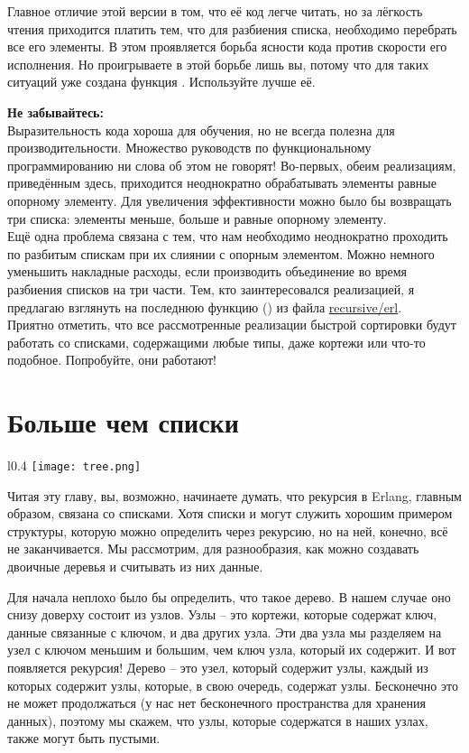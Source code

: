 Главное отличие этой версии в том, что её код легче читать, но за лёгкость чтения приходится платить тем, что для разбиения списка, необходимо перебрать все его элементы. В этом проявляется борьба ясности кода против скорости его исполнения. Но проигрываете в этой борьбе лишь вы, потому что для таких ситуаций уже создана функция . Используйте лучше её.\\
\colorbox{lorange}
{
    \begin{minipage}{1.0\linewidth}
\textbf{Не забывайтесь:}\\
Выразительность кода хороша для обучения, но не всегда полезна для производительности. Множество руководств по функциональному программированию ни слова об этом не говорят! Во\--первых, обеим реализациям, приведённым здесь, приходится неоднократно обрабатывать элементы равные опорному элементу. Для увеличения эффективности можно было бы возвращать три списка: элементы меньше, больше и равные опорному элементу.\\
Ещё одна проблема связана с тем, что нам необходимо неоднократно проходить по разбитым спискам при их слиянии с опорным элементом. Можно немного уменьшить накладные расходы, если производить объединение во время разбиения списков на три части. Тем, кто заинтересовался реализацией, я предлагаю взглянуть на последнюю функцию () из файла \href{http://learnyousomeerlang.com/static/erlang/recursive.erl}{recursive/erl}.\\
Приятно отметить, что все рассмотренные реализации быстрой сортировки будут работать со списками, содержащими любые типы, даже кортежи или что\--то подобное. Попробуйте, они работают!
    \end{minipage}
}
\section{Больше чем списки}
\begin{wrapfigure}{l}{0.4\linewidth}
    \texttt{[image: tree.png]}
\end{wrapfigure}
Читая эту главу, вы, возможно, начинаете думать, что рекурсия в Erlang, главным образом, связана со списками. Хотя списки и могут служить хорошим примером структуры, которую можно определить через рекурсию, но на ней, конечно, всё не заканчивается. Мы рассмотрим, для разнообразия, как можно создавать двоичные деревья и считывать из них данные.

Для начала неплохо было бы определить, что такое дерево. В нашем случае оно снизу доверху состоит из узлов. Узлы \--- это кортежи, которые содержат ключ, данные связанные с ключом, и два других узла. Эти два узла мы разделяем на узел с ключом меньшим и большим, чем ключ узла, который их содержит. И вот появляется рекурсия! Дерево \--- это узел, который содержит узлы, каждый из которых содержит узлы, которые, в свою очередь, содержат узлы. Бесконечно это не может продолжаться (у нас нет бесконечного пространства для хранения данных), поэтому мы скажем, что узлы, которые содержатся в наших узлах, также могут быть пустыми.

